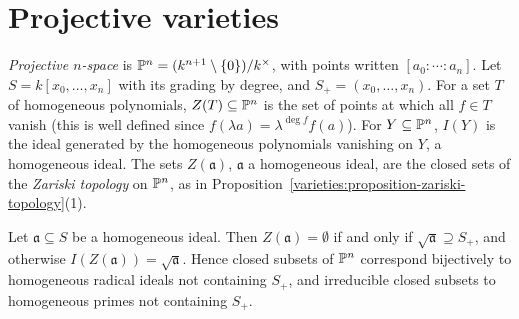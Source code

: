 \section{Projective varieties}\label{varieties:section-projective}

\begin{definition}\label{varieties:definition-projective-space}
\emph{Projective $n$-space} is $\mathbb{P}^n = (k^{n+1} \setminus \{0\})/k^\times$, with points written $[a_0 : \cdots : a_n]$. Let $S = k[x_0, \ldots, x_n]$
with its grading by degree, and $S_+ = (x_0, \ldots, x_n)$. For a set $T$ of homogeneous polynomials, $Z(T) \subseteq \mathbb{P}^n$ is the set of points at
which all $f \in T$ vanish (this is well defined since $f(\lambda a) = \lambda^{\deg f}f(a)$). For $Y \subseteq \mathbb{P}^n$, $I(Y)$ is the ideal generated
by the homogeneous polynomials vanishing on $Y$, a homogeneous ideal. The sets $Z(\mathfrak{a})$, $\mathfrak{a}$ a homogeneous ideal, are the closed
sets of the \emph{Zariski topology} on $\mathbb{P}^n$, as in Proposition~\ref{varieties:proposition-zariski-topology}(1).
\end{definition}

\begin{proposition}\label{varieties:proposition-projective-nullstellensatz}
Let $\mathfrak{a} \subseteq S$ be a homogeneous ideal. Then $Z(\mathfrak{a}) = \emptyset$ if and only if $\sqrt{\mathfrak{a}} \supseteq S_+$, and
otherwise $I(Z(\mathfrak{a})) = \sqrt{\mathfrak{a}}$. Hence closed subsets of $\mathbb{P}^n$ correspond bijectively to homogeneous radical ideals not
containing $S_+$, and irreducible closed subsets to homogeneous primes not containing $S_+$.
\end{proposition}

